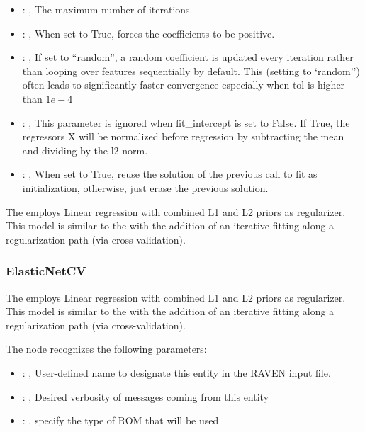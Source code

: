 \begin{itemize}
    \item {}: , 
      The maximum number of iterations.

    \item {}: , 
      When set to True, forces the coefficients to be positive.

    \item {}: , 
      If set to ``random'', a random coefficient is updated every iteration
      rather than looping over features sequentially by default. This (setting to `random'')
      often leads to significantly faster convergence especially when tol is higher than $1e-4$

    \item {}: , 
      This parameter is ignored when fit\_intercept is set to False. If True,
      the regressors X will be normalized before regression by subtracting the mean and
      dividing by the l2-norm.

    \item {}: , 
      When set to True, reuse the solution of the previous call
      to fit as initialization, otherwise, just erase the previous solution.
  \end{itemize}
 The  employs                         Linear regression with combined L1 and
 L2 priors as regularizer.                         This model is similar to the 
 with the addition of an iterative fitting along a regularization path (via cross-validation).

\subsubsection{ElasticNetCV}
  The  employs                         Linear regression with combined L1 and
  L2 priors as regularizer.                         This model is similar to the
                           with the addition of an iterative fitting along a
  regularization path (via cross-validation).

  The  node recognizes the following parameters:
    \begin{itemize}
      \item {}: , 
        User-defined name to designate this entity in the RAVEN input file.
      \item {}: , 
        Desired verbosity of messages coming from this entity
      \item {}: , 
        specify the type of ROM that will be used
  \end{itemize}

